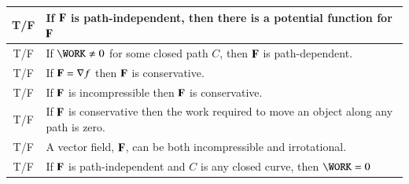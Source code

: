 \documentclass[11pt]{article}
\begin{document}
	\setlength{\extrarowheight}{0.2cm}
	\begin{tabular}{| c | p{17.2cm} |}
		\hline
		T\quad/\quad F & If ${\bf F}$ is path-independent, then there is a potential function for ${\bf F}$\\
		\hline
		T\quad/\quad F & If $\WORK \ne 0$ for some closed path $C$, then ${\bf F}$ is path-dependent.\\
		\hline
		T\quad/\quad F & If ${\bf F} = \nabla f$ then ${\bf F}$ is conservative.\\
		\hline
		T\quad/\quad F & If ${\bf F}$ is incompressible then ${\bf F}$ is conservative.\\
		\hline
		T\quad/\quad F & If ${\bf F}$ is conservative then the work required to move an object along any path is zero.\\
		\hline
		T\quad/\quad F & A vector field, ${\bf F}$, can be both incompressible and irrotational.\\
		\hline
		T\quad/\quad F & If ${\bf F}$ is path-independent and $C$ is any closed curve, then $\WORK = 0$\\
		\hline
	\end{tabular}
\end{document}
